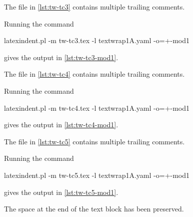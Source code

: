  \begin{example}
 The file in \cref{lst:tw-tc3} contains multiple trailing comments.

 Running the command

 \begin{commandshell}
latexindent.pl -m tw-tc3.tex -l textwrap1A.yaml -o=+-mod1 
\end{commandshell}

 gives the output in \cref{lst:tw-tc3-mod1}.
 \begin{cmhtcbraster}[raster column skip=.1\linewidth]
 \end{cmhtcbraster}
 \end{example}

 \begin{example}
 The file in \cref{lst:tw-tc4} contains multiple trailing comments.

 Running the command

 \begin{commandshell}
latexindent.pl -m tw-tc4.tex -l textwrap1A.yaml -o=+-mod1 
\end{commandshell}

 gives the output in \cref{lst:tw-tc4-mod1}.
 \begin{cmhtcbraster}[raster column skip=.1\linewidth]
 \end{cmhtcbraster}
 \end{example}

 \begin{example}
 The file in \cref{lst:tw-tc5} contains multiple trailing comments.

 Running the command

 \begin{commandshell}
latexindent.pl -m tw-tc5.tex -l textwrap1A.yaml -o=+-mod1 
\end{commandshell}

 gives the output in \cref{lst:tw-tc5-mod1}.
 \begin{cmhtcbraster}[raster column skip=.1\linewidth]
 \end{cmhtcbraster}
 The space at the end of the text block has been preserved.
 \end{example}


